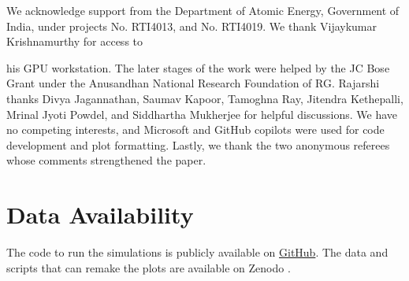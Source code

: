 We acknowledge support from the Department of Atomic Energy, Government of India, under projects No. RTI4013, and No. RTI4019. We thank Vijaykumar Krishnamurthy for access to {his GPU workstation. The later stages of the work were helped by the JC Bose Grant under the Anusandhan National Research Foundation of RG. Rajarshi thanks Divya Jagannathan, Saumav Kapoor, Tamoghna Ray, Jitendra Kethepalli, Mrinal Jyoti Powdel, and Siddhartha Mukherjee for helpful discussions. We have no competing interests, and Microsoft and GitHub copilots were used for code development and plot formatting. Lastly, we thank the two anonymous referees whose comments strengthened the paper.
\section{Data Availability}
The code to run the simulations is publicly available on \href{https://github.com/Rajarshi-prime/2D_Caustics}{GitHub}. The data and scripts that can remake the plots are available on Zenodo \cite{chattopadhyay2026v2}.

\appendix
}
